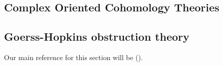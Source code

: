 









\newpage
\subsection{Complex Oriented Cohomology Theories}



\newpage
\subsection{Goerss-Hopkins obstruction theory}
Our main reference for this section will be (\cite{Mazel-Gee2018}).




